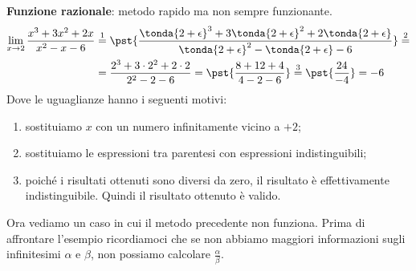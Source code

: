 \begin{esempio}
\textbf{Funzione razionale}: metodo rapido ma non sempre funzionante.
\begin{align*}
\lim_{x \rightarrow 2} \frac{x^3+3x^2+2x}{x^2-x-6} & \stackrel{1}{=} 
\pst{\frac
  {\tonda{2+\epsilon}^3+3\tonda{2+\epsilon}^2+2\tonda{2+\epsilon}}
  {\tonda{2+\epsilon}^2-\tonda{2+\epsilon}-6}} \stackrel{2}{=}\\ 
  &=\frac{2^3+3\cdot 2^2+2\cdot 2}{2^2-2-6} =
  \pst{\frac{8+12+4}{4-2-6}} \stackrel{3}{=} \pst{\frac{24}{-4}} =-6
\end{align*}
Dove le uguaglianze hanno i seguenti motivi:
\begin{enumerate} [nosep]
 \item sostituiamo \(x\) con un numero infinitamente vicino a \(+2\);
 \item sostituiamo le espressioni tra parentesi con espressioni 
indistinguibili;
 \item poiché i risultati ottenuti sono diversi da zero, il risultato è 
effettivamente indistinguibile. Quindi il risultato ottenuto è valido.
\end{enumerate}
\end{esempio}

Ora vediamo un caso in cui il metodo precedente non funziona. Prima di 
affrontare l'esempio ricordiamoci che se non abbiamo maggiori informazioni 
sugli infinitesimi \(\alpha\) e \(\beta\), non possiamo calcolare 
\(\frac{\alpha}{\beta}\).

